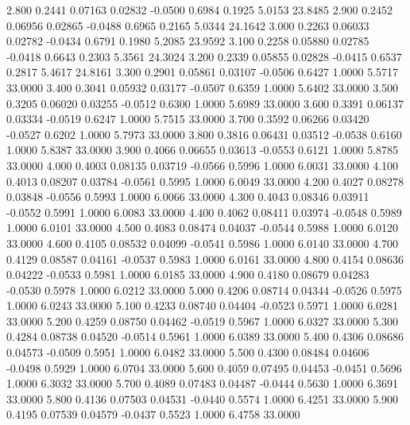    2.800   0.2441   0.07163   0.02832  -0.0500   0.6984   0.1925   5.0153  23.8485
   2.900   0.2452   0.06956   0.02865  -0.0488   0.6965   0.2165   5.0344  24.1642
   3.000   0.2263   0.06033   0.02782  -0.0434   0.6791   0.1980   5.2085  23.9592
   3.100   0.2258   0.05880   0.02785  -0.0418   0.6643   0.2303   5.3561  24.3024
   3.200   0.2339   0.05855   0.02828  -0.0415   0.6537   0.2817   5.4617  24.8161
   3.300   0.2901   0.05861   0.03107  -0.0506   0.6427   1.0000   5.5717  33.0000
   3.400   0.3041   0.05932   0.03177  -0.0507   0.6359   1.0000   5.6402  33.0000
   3.500   0.3205   0.06020   0.03255  -0.0512   0.6300   1.0000   5.6989  33.0000
   3.600   0.3391   0.06137   0.03334  -0.0519   0.6247   1.0000   5.7515  33.0000
   3.700   0.3592   0.06266   0.03420  -0.0527   0.6202   1.0000   5.7973  33.0000
   3.800   0.3816   0.06431   0.03512  -0.0538   0.6160   1.0000   5.8387  33.0000
   3.900   0.4066   0.06655   0.03613  -0.0553   0.6121   1.0000   5.8785  33.0000
   4.000   0.4003   0.08135   0.03719  -0.0566   0.5996   1.0000   6.0031  33.0000
   4.100   0.4013   0.08207   0.03784  -0.0561   0.5995   1.0000   6.0049  33.0000
   4.200   0.4027   0.08278   0.03848  -0.0556   0.5993   1.0000   6.0066  33.0000
   4.300   0.4043   0.08346   0.03911  -0.0552   0.5991   1.0000   6.0083  33.0000
   4.400   0.4062   0.08411   0.03974  -0.0548   0.5989   1.0000   6.0101  33.0000
   4.500   0.4083   0.08474   0.04037  -0.0544   0.5988   1.0000   6.0120  33.0000
   4.600   0.4105   0.08532   0.04099  -0.0541   0.5986   1.0000   6.0140  33.0000
   4.700   0.4129   0.08587   0.04161  -0.0537   0.5983   1.0000   6.0161  33.0000
   4.800   0.4154   0.08636   0.04222  -0.0533   0.5981   1.0000   6.0185  33.0000
   4.900   0.4180   0.08679   0.04283  -0.0530   0.5978   1.0000   6.0212  33.0000
   5.000   0.4206   0.08714   0.04344  -0.0526   0.5975   1.0000   6.0243  33.0000
   5.100   0.4233   0.08740   0.04404  -0.0523   0.5971   1.0000   6.0281  33.0000
   5.200   0.4259   0.08750   0.04462  -0.0519   0.5967   1.0000   6.0327  33.0000
   5.300   0.4284   0.08738   0.04520  -0.0514   0.5961   1.0000   6.0389  33.0000
   5.400   0.4306   0.08686   0.04573  -0.0509   0.5951   1.0000   6.0482  33.0000
   5.500   0.4300   0.08484   0.04606  -0.0498   0.5929   1.0000   6.0704  33.0000
   5.600   0.4059   0.07495   0.04453  -0.0451   0.5696   1.0000   6.3032  33.0000
   5.700   0.4089   0.07483   0.04487  -0.0444   0.5630   1.0000   6.3691  33.0000
   5.800   0.4136   0.07503   0.04531  -0.0440   0.5574   1.0000   6.4251  33.0000
   5.900   0.4195   0.07539   0.04579  -0.0437   0.5523   1.0000   6.4758  33.0000
